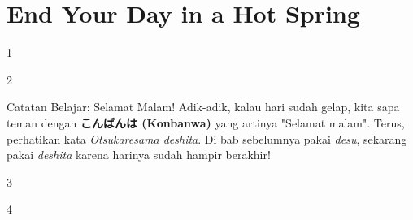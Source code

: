 ﻿\chapter{End Your Day in a Hot Spring}

\begin{convobox}{1}
    \noindent

    \vspace{1.5em}
\end{convobox}

\begin{convobox}{2}
    \noindent
      
     

    \vspace{1.5em}
\end{convobox}

\begin{lessonbox}{Catatan Belajar: Selamat Malam!}
    Adik-adik, kalau hari sudah gelap, kita sapa teman dengan \textbf{こんばんは (Konbanwa)} yang artinya "Selamat malam". Terus, perhatikan kata \textit{Otsukaresama deshita}. Di bab sebelumnya pakai \textit{desu}, sekarang pakai \textit{deshita} karena harinya sudah hampir berakhir!
\end{lessonbox}

\begin{convobox}{3}
    \noindent
      

    \vspace{1.5em}
\end{convobox}

\begin{convobox}{4}
    \noindent
      

    \vspace{1.5em}
\end{convobox}

